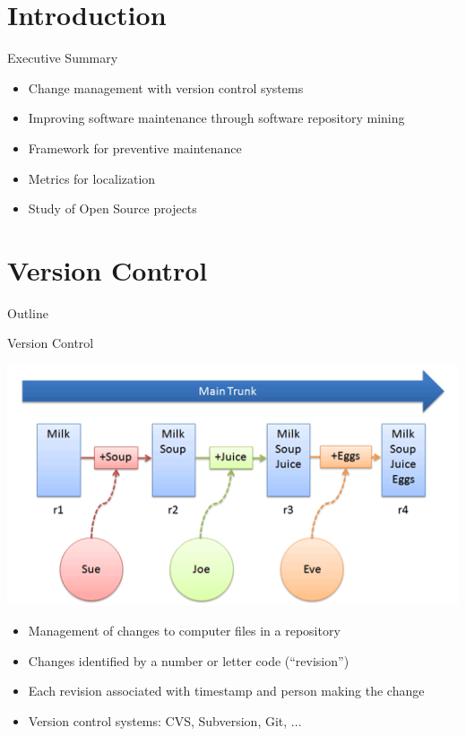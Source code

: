 \note{
}


\section*{Introduction}

\begin{frame}{Executive Summary}
  \begin{itemize}
  \item Change management with version control systems
  \item Improving software maintenance through software repository
    mining
  \item Framework for preventive maintenance
  \item Metrics for localization
  \item Study of Open Source projects
  \end{itemize}
\end{frame}

\note{
}


\section{Version Control}

\begin{frame}{Outline}
  \tableofcontents[current]
\end{frame}

\note{
}

\begin{frame}{Version Control}
  \begin{center}
    \includegraphics[scale=0.35]{figures/vcs}
  \end{center}


  \begin{itemize}
  \item Management of changes to computer files in a repository
  \item Changes identified by a number or letter code (``revision'')
  \item Each revision associated with timestamp and person
    making the change
  \item Version control systems: CVS, Subversion, Git, ...
  \end{itemize}
\end{frame}

